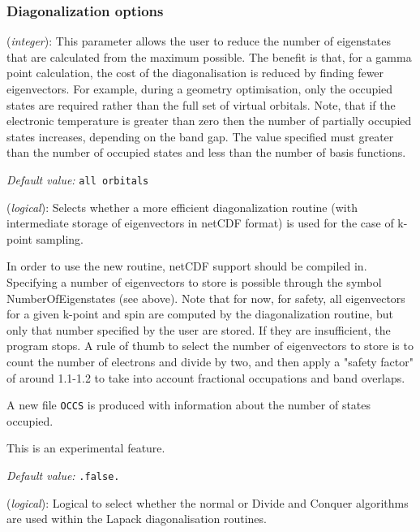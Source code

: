 \documentclass[11pt]{article}
\begin{document}
\subsubsection{Diagonalization options}
\begin{description}
\itemsep 10pt
\parsep 0pt

\item[{\bf NumberOfEigenStates}] ({\it integer}):
This parameter allows the user to reduce the number of eigenstates
that are calculated from the maximum possible. The benefit is that,
for a gamma point calculation, the cost of the diagonalisation is
reduced by finding fewer eigenvectors. For example, during a geometry
optimisation, only the occupied states are required rather than the
full set of virtual orbitals. Note, that if the electronic temperature
is greater than zero then the number of partially occupied states
increases, depending on the band gap.
The value specified must greater than the number of occupied states
and less than the number of basis functions.

{\it Default value:} {\tt all orbitals}

\item[{\bf Use.New.Diagk}] ({\it logical}):
Selects whether a more efficient diagonalization routine (with
intermediate storage of eigenvectors in netCDF format) is
used for the case of k-point sampling.

In order to use the new routine, netCDF support should be compiled in.
Specifying a number of eigenvectors to store is possible through
the symbol NumberOfEigenstates (see above). Note that for now, for safety, all
eigenvectors for a given k-point and spin are computed by the
diagonalization routine, but only that number specified by the user
are stored. If they are insufficient, the program stops.  A rule of
thumb to select the number of eigenvectors to store is to count the
number of electrons and divide by two, and then apply a "safety
factor" of around 1.1-1.2 to take into account fractional occupations
and band overlaps.

A new file {\tt OCCS} is produced with information about the number of
states occupied.

This is an experimental feature.

{\it Default value:} {\tt .false.}


\item[{\bf Diag.DivideAndConquer}] ({\it logical}):
Logical to select whether the normal or Divide and Conquer algorithms are
used within the Lapack diagonalisation routines.


\end{description}
\end{document}
